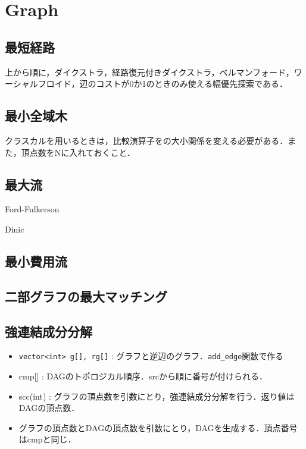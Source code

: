 \section{Graph}

\subsection{最短経路}
上から順に，ダイクストラ，経路復元付きダイクストラ，ベルマンフォード，ワーシャルフロイド，辺のコストが0か1のときのみ使える幅優先探索である．


\subsection{最小全域木}
クラスカルを用いるときは，比較演算子をの大小関係を変える必要がある．また，頂点数をNに入れておくこと．


\subsection{最大流}
Ford-Fulkerson

Dinic


\subsection{最小費用流}


\subsection{二部グラフの最大マッチング}



\subsection{強連結成分分解}
\begin{itemize}
  \item \verb#vector<int> g[], rg[]# : グラフと逆辺のグラフ．\verb#add_edge#関数で作る
  \item cmp[] : DAGのトポロジカル順序．srcから順に番号が付けられる．
  \item scc(int) : グラフの頂点数を引数にとり，強連結成分分解を行う．返り値はDAGの頂点数．
  \item グラフの頂点数とDAGの頂点数を引数にとり，DAGを生成する．頂点番号はcmpと同じ．
\end{itemize}


